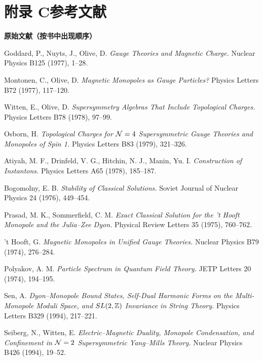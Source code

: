 \section*{附录 C\quad 参考文献}

\begingroup
\small
\setlength{\parindent}{0pt}
\setlength{\parskip}{0.45em}
\raggedright

\noindent\textbf{原始文献（按书中出现顺序）}

Goddard, P., Nuyts, J., Olive, D. \emph{Gauge Theories and Magnetic Charge.} Nuclear Physics B125 (1977), 1--28.

Montonen, C., Olive, D. \emph{Magnetic Monopoles as Gauge Particles?} Physics Letters B72 (1977), 117--120.

Witten, E., Olive, D. \emph{Supersymmetry Algebras That Include Topological Charges.} Physics Letters B78 (1978), 97--99.

Osborn, H. \emph{Topological Charges for $\mathcal{N}=4$ Supersymmetric Gauge Theories and Monopoles of Spin 1.} Physics Letters B83 (1979), 321--326.

Atiyah, M. F., Drinfeld, V. G., Hitchin, N. J., Manin, Yu. I. \emph{Construction of Instantons.} Physics Letters A65 (1978), 185--187.

Bogomolny, E. B. \emph{Stability of Classical Solutions.} Soviet Journal of Nuclear Physics 24 (1976), 449--454.

Prasad, M. K., Sommerfield, C. M. \emph{Exact Classical Solution for the 't Hooft Monopole and the Julia--Zee Dyon.} Physical Review Letters 35 (1975), 760--762.

't Hooft, G. \emph{Magnetic Monopoles in Unified Gauge Theories.} Nuclear Physics B79 (1974), 276--284.

Polyakov, A. M. \emph{Particle Spectrum in Quantum Field Theory.} JETP Letters 20 (1974), 194--195.

Sen, A. \emph{Dyon--Monopole Bound States, Self-Dual Harmonic Forms on the Multi-Monopole Moduli Space, and $SL(2,\mathbb{Z})$ Invariance in String Theory.} Physics Letters B329 (1994), 217--221.

Seiberg, N., Witten, E. \emph{Electric--Magnetic Duality, Monopole Condensation, and Confinement in $\mathcal{N}=2$ Supersymmetric Yang--Mills Theory.} Nuclear Physics B426 (1994), 19--52.

